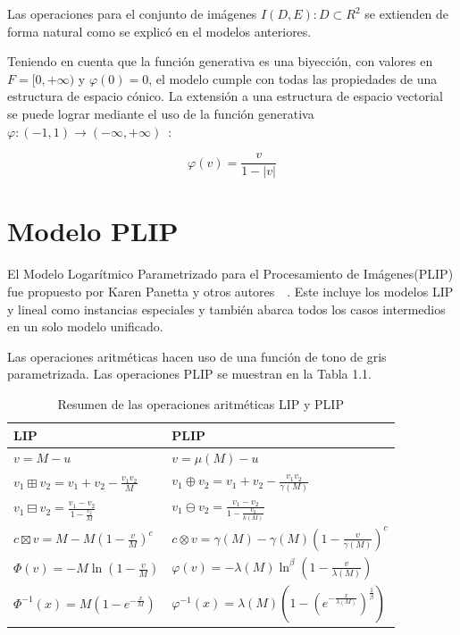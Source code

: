 Las operaciones para el conjunto de im\'agenes $I(D,E):D\subset R^2$ se extienden de forma natural como se explic\'o en el modelos anteriores.

Teniendo en cuenta que la función generativa es una biyección, con valores en $F = [ 0 , +\infty )$ y $\varphi(0)=0$, el modelo cumple con todas las propiedades de una estructura de espacio cónico. La extensión a una estructura de espacio vectorial se puede lograr mediante el uso de la función generativa $\varphi:(-1,1)\rightarrow (-\infty,+\infty)$~\cite{florea2009piecewise}:

\begin{equation}
	\varphi(v)=\frac{v}{1-|v|}
\end{equation}

\section{Modelo PLIP}

El Modelo Logar\'itmico Parametrizado para el Procesamiento de Im\'agenes(PLIP) fue propuesto por Karen Panetta y otros autores~\cite{panetta2007parameterization}~\cite{panetta2010parameterized}. Este incluye los modelos LIP y lineal como instancias especiales y también abarca todos los casos intermedios en un solo modelo unificado.

Las operaciones aritméticas hacen uso de una función de tono de gris parametrizada. Las operaciones PLIP se muestran en la Tabla 1.1.

\begin{table}
	\caption{Resumen de las operaciones aritm\'eticas LIP y PLIP}
	\begin{center}
		\begin{tabular}{|l|l|}
			\hline 
			\textbf{LIP} & \textbf{PLIP}\\
			\hline
			$v=M-u$ & $v=\mu(M)-u$\\
			\hline
			$v_1\boxplus v_2=v_1+v_2-\frac{v_1v_2}{M}$ & $v_1\oplus v_2=v_1+v_2-\frac{v_1v_2}{\gamma(M)}$\\
			\hline
			$v_1\boxminus v_2=\frac{v_1-v_2}{1-\frac{v_2}{M}}$ & $v_1\ominus v_2=\frac{v_1-v_2}{1-\frac{v_2}{k(M)}}$\\
			\hline
			$c\boxtimes v=M-M(1-\frac{v}{M})^c$ & $c\otimes v=\gamma(M)-\gamma(M)(1-\frac{v}{\gamma(M)})^c$\\
			\hline
			$\varPhi(v)=-M\ln(1-\frac{v}{M})$ & $\varphi(v)=-\lambda(M)\ln^\beta(1-\frac{v}{\lambda(M)})$\\
			\hline
			$\varPhi^{-1}(x)=M\left(1-e^{-\frac{x}{M}}\right)$ & $\varphi^{-1}(x)=\lambda(M)\left(1-\left(e^{-\frac{x}{\lambda(M)}}\right)^{\frac{1}{\beta}}\right)$\\
			\hline
		\end{tabular}
	\end{center}
\end{table}


